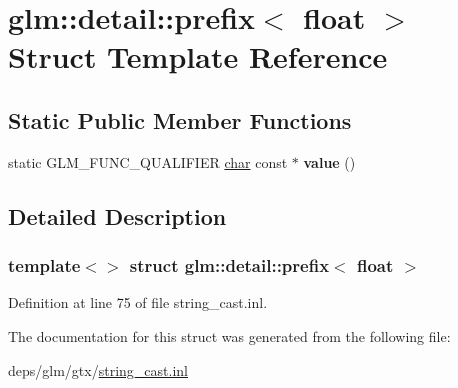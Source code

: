 \hypertarget{structglm_1_1detail_1_1prefix_3_01float_01_4}{}\section{glm\+:\+:detail\+:\+:prefix$<$ float $>$ Struct Template Reference}
\label{structglm_1_1detail_1_1prefix_3_01float_01_4}
\subsection*{Static Public Member Functions}
\begin{DoxyCompactItemize}
\item 
\mbox{\label{structglm_1_1detail_1_1prefix_3_01float_01_4_a106cde8d6d62001a05cbf21367467591}} 
static G\+L\+M\+\_\+\+F\+U\+N\+C\+\_\+\+Q\+U\+A\+L\+I\+F\+I\+ER \hyperlink{classchar}{char} const  $\ast$ {\bfseries value} ()
\end{DoxyCompactItemize}


\subsection{Detailed Description}
\subsubsection*{template$<$$>$\newline
struct glm\+::detail\+::prefix$<$ float $>$}



Definition at line 75 of file string\+\_\+cast.\+inl.



The documentation for this struct was generated from the following file\+:\begin{DoxyCompactItemize}
\item 
deps/glm/gtx/\hyperlink{string__cast_8inl}{string\+\_\+cast.\+inl}\end{DoxyCompactItemize}
